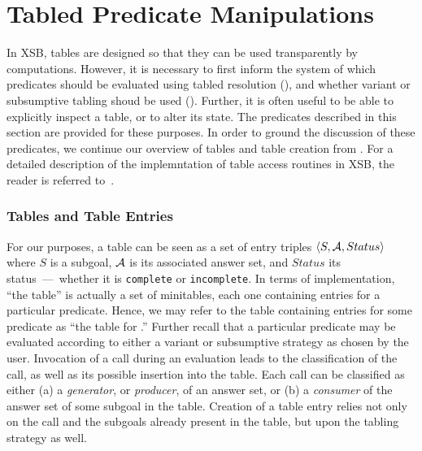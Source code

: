 
\newcommand{\retn}{\code{ret/n}}


\section{Tabled Predicate Manipulations} \label{sec:TablingPredicates}

In XSB, tables are designed so that they can be used transparently by
computations.  However, it is necessary to first inform the system of
which predicates should be evaluated using tabled resolution
(), and whether variant or subsumptive
tabling shoud be used ().  Further, it
is often useful to be able to explicitly inspect a table, or to alter
its state.  The predicates described in this section are provided for
these purposes.  In order to ground the discussion of these
predicates, we continue our overview of tables and table creation from
.  For a detailed description of the
implemntation of table access routines in XSB, the reader is referred
to~\cite{RRSSW98,TST99,CuSW99b}.


\subsubsection*{Tables and Table Entries}

For our purposes, a table can be seen as a set of entry triples $\langle
S,{\cal A},Status \rangle$ where $S$ is a subgoal, ${\cal A}$ is its associated
answer set, and $Status$ its status~---~whether it is \texttt{complete}
or \texttt{incomplete}.  In terms of implementation, ``the table'' is
actually a set of minitables, each one containing entries for a
particular predicate.  Hence, we may refer to the table containing
entries for some predicate  as ``the table for .''
Further recall that a particular predicate may be evaluated according to
either a variant or subsumptive strategy as chosen by the user.
Invocation of a call during an evaluation leads to the classification of
the call, as well as its possible insertion into the table.  Each call
can be classified as either (a) a \emph{generator}, or \emph{producer},
of an answer set, or (b) a \emph{consumer} of the answer set of some
subgoal in the table.  Creation of a table entry relies not only on the
call and the subgoals already present in the table, but upon the tabling
strategy as well.  

